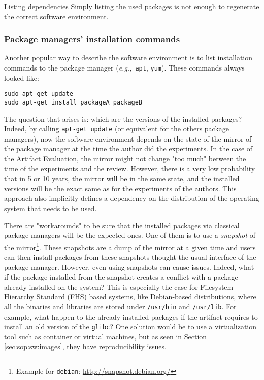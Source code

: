 \documentclass[sigconf,natbib=false]{acmart}
\newcommand{\eg}{\emph{e.g.,}}
\newcommand{\aeval}{Artifact Evaluation}
\begin{document}
\begin{lesson}{Listing dependencies}{}
  Simply listing the used packages is not enough to regenerate the correct software environment.
\end{lesson}

\subsubsection{Package managers' installation commands}

Another popular way to describe the software environment is to list installation commands to the package manager (\eg\ \texttt{apt}, \texttt{yum}).
These commands always looked like:

\begin{verbatim}
sudo apt-get update
sudo apt-get install packageA packageB
\end{verbatim}

The question that arises is: which are the versions of the installed packages?
Indeed, by calling \texttt{apt-get update} (or equivalent for the others package managers), now the software environment depends on the state of the mirror of the package manager at the time the author did the experiments.
In the case of the \aeval, the mirror might not change "too much" between the time of the experiments and the review.
However, there is a very low probability that in 5 or 10 years, the mirror will be in the same state, and the installed versions will be the exact same as for the experiments of the authors.
This approach also implicitly defines a dependency on the distribution of the operating system that needs to be used.

There are "workarounds" to be sure that the installed packages via classical package managers will be the expected ones. 
One of them is to use a \emph{snapshot} of the mirror\footnote{Example for \texttt{debian}: \url{http://snapshot.debian.org/}}.
These snapshots are a dump of the mirror at a given time and users can then install packages from these snapshots thought the usual interface of the package manager.
However, even using snapshots can cause issues.
Indeed, what if the package installed from the snapshot creates a conflict with a package already installed on the system?
This is especially the case for Filesystem Hierarchy Standard (FHS) based systems, like Debian-based distributions, where all the binaries and libraries are stored under \texttt{/usr/bin} and \texttt{/usr/lib}.
For example, what happen to the already installed packages if the artifact requires to install an old version of the \texttt{glibc}? 
One solution would be to use a virtualization tool such as container or virtual machines, but as seen in Section \ref{sec:sop:sw:images}, they have reproducibility issues.
\end{document}
